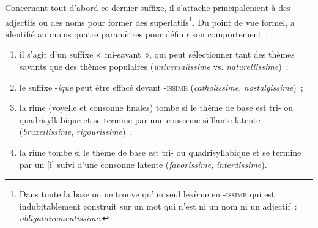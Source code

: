 \documentclass[output=paper]{langsci/langscibook}
\begin{document}
Concernant tout d'abord ce dernier suffixe, il s'attache principalement
à des adjectifs ou des noms pour former des superlatifs\footnote{Dans
  toute la base on ne trouve qu'un seul lexème en -\textsc{issime} qui
  est indubitablement construit sur un mot qui n'est ni un nom ni un
  adjectif~: \emph{obligatoirementissime}.}. Du point de vue formel,
%
\citet{Plenat2002a} %
%
a identifié au moins quatre paramètres pour définir son
comportement~:

\begin{enumerate}[label=\roman*)]
\item il s'agit d'un suffixe «~mi-savant~», qui peut sélectionner tant des
thèmes savants que des thèmes populaires (\emph{universalissime} vs.
\emph{naturellissime})~;

\item le suffixe -\emph{ique} peut être effacé devant -\textsc{issime}
(\emph{catholissime}, \emph{nostalgissime})~;

\item la rime (voyelle et consonne finales) tombe si le thème de base est
tri- ou quadrisyllabique et se termine par une consonne sifflante
latente (\emph{bruxellissime}, \emph{rigourissime})~;

\item la rime tombe si le thème de base est tri- ou quadrisyllabique et
se termine par un {[}i{]} suivi d'une consonne latente
(\emph{favorissime}, \emph{interdissime}).
\end{enumerate}
\end{document}
